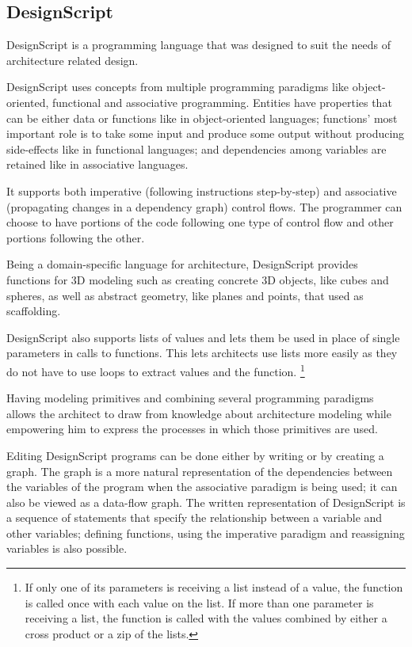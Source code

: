 \subsection{DesignScript}
\label{section:designscript:related}
DesignScript\cite{aish2012designscript} is a programming language that was designed to suit the needs of architecture related design.

DesignScript uses concepts from multiple programming paradigms like object-oriented, functional and associative programming.
Entities have properties that can be either data or functions like in object-oriented languages; functions' most important role is to take some input and produce some output without producing side-effects like in functional languages; and dependencies among variables are retained like in associative languages.

It supports both imperative (following instructions step-by-step) and associative (propagating changes in a dependency graph) control flows.
The programmer can choose to have portions of the code following one type of control flow and other portions following the other.

Being a domain-specific language for architecture, DesignScript provides functions for 3D modeling such as creating concrete 3D objects, like cubes and spheres, as well as abstract geometry, like planes and points, that used as scaffolding.

DesignScript also supports lists of values and lets them be used in place of single parameters in calls to functions.
This lets architects use lists more easily as they do not have to use loops to extract values and the function.%
\footnote{If only one of its parameters is receiving a list instead of a value, the function is called once with each value on the list.
If more than one parameter is receiving a list, the function is called with the values combined by either a cross product or a zip of the lists.}

Having modeling primitives and combining several programming paradigms allows the architect to draw from knowledge about architecture modeling while empowering him to express the processes in which those primitives are used.

Editing DesignScript programs can be done either by writing or by creating a graph.
The graph is a more natural representation of the dependencies between the variables of the program when the associative paradigm is being used; it can also be viewed as a data-flow graph.
The written representation of DesignScript is a sequence of statements that specify the relationship between a variable and other variables; defining functions, using the imperative paradigm and reassigning variables is also possible.


